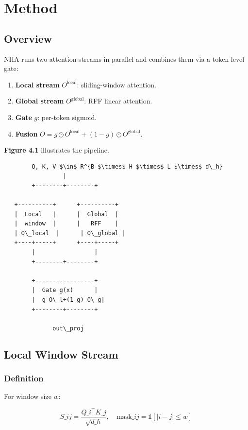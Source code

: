 
\section{Method}

\subsection{Overview}

NHA runs two attention streams in parallel and combines them via a token-level 
gate:

\begin{enumerate}
\item \textbf{Local stream} $O^\text{local}$: sliding-window attention.
\item \textbf{Global stream} $O^\text{global}$: RFF linear attention.
\item \textbf{Gate} $g$: per-token sigmoid.
\item \textbf{Fusion} $O = g \odot O^\text{local} + (1 - g) \odot O^\text{global}$.

\end{enumerate}
\textbf{Figure 4.1} illustrates the pipeline.

\begin{lstlisting}
        Q, K, V $\in$ R^{B $\times$ H $\times$ L $\times$ d\_h}
                 |
        +--------+--------+
                           
   +----------+      +----------+
   |  Local   |      |  Global  |
   |  window  |      |   RFF    |
   | O\_local  |      | O\_global |
   +----+-----+      +----+-----+
        |                 |
        +--------+--------+
                  
        +-----------------+
        |  Gate g(x)      |
        |  g O\_l+(1-g) O\_g|
        +--------+--------+
                  
              out\_proj
\end{lstlisting}

\subsection{Local Window Stream}

\subsubsection{Definition}

For window size $w$:

\[
S\_{ij} = \frac{Q\_i^\top K\_j}{\sqrt{d\_h}}, \quad
\text{mask}\_{ij} = \mathbb{1}[|i - j| \leq w]
\tag{4.1}
\]

